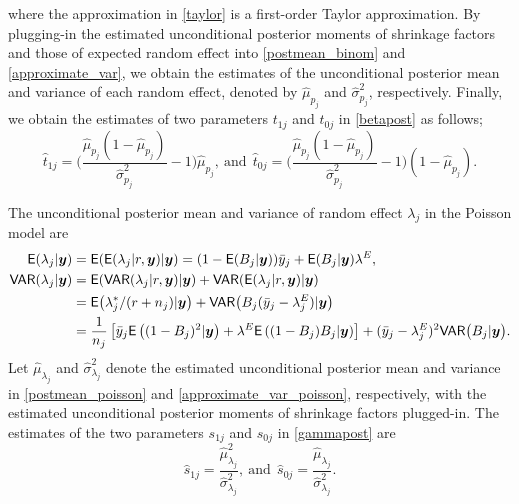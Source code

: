 \documentclass[article]{jss}
\begin{document}
where the approximation in \eqref{taylor} is a first-order Taylor approximation. By plugging-in the estimated unconditional posterior moments of shrinkage factors and those of expected random effect into   \eqref{postmean_binom} and \eqref{approximate_var}, we obtain the estimates of the unconditional posterior mean and variance of each random effect, denoted by $\hat{\mu}_{p_j}$ and $\hat{\sigma}^2_{p_j}$, respectively. Finally, we obtain the estimates of two parameters $t_{1j}$ and $t_{0j}$ in  \eqref{betapost} as follows;
\begin{equation}\label{posttrueprob}
\hat{t}_{1j}=\bigg(\frac{\hat{\mu}_{p_j}(1-\hat{\mu}_{p_j})}{\hat{\sigma}^2_{p_j}}-1\bigg)\hat{\mu}_{p_j},~\textrm{and}~~\hat{t}_{0j}=\bigg(\frac{\hat{\mu}_{p_j}(1-\hat{\mu}_{p_j})}{\hat{\sigma}^2_{p_j}}-1\bigg)(1-\hat{\mu}_{p_j}).
\end{equation}


The unconditional posterior mean and variance of random effect $\lambda_j$ in the Poisson model are
\begin{align}
\mathsf{E}(\lambda_j\vert \boldsymbol{y}) &=\mathsf{E}(\mathsf{E}(\lambda_{j}\vert r, \boldsymbol{y})\vert\boldsymbol{y})=(1-\mathsf{E}(B_j\vert\boldsymbol{y}))\bar{y}_j + \mathsf{E}(B_j\vert  \boldsymbol{y})\lambda^E,\label{postmean_poisson} \\
\mathsf{VAR}(\lambda_{j}\vert \boldsymbol{y}) &=  \mathsf{E}(\mathsf{VAR}(\lambda_{j}\vert r,  \boldsymbol{y})\vert \boldsymbol{y})+\mathsf{VAR}(\mathsf{E}(\lambda_{j}\vert r, \boldsymbol{y})\vert \boldsymbol{y})\label{postvar_poisson}\\
&= \mathsf{E}\big(\lambda^{\ast}_{j}/ (r+n_{j})\vert  \boldsymbol{y}\big)+\mathsf{VAR}\big(B_{j}(\bar{y}_{j}-\lambda^E_{j})\vert \boldsymbol{y}\big) \\
&=\frac{1}{n_j}\left[\bar{y}_j\mathsf{E}\left((1-B_j)^2\vert \boldsymbol{y}\right)+\lambda^E\mathsf{E}\left((1-B_j)B_j\vert \boldsymbol{y}\right)\right]+(\bar{y}_{j}-\lambda^E_{j})^2\mathsf{VAR}\big(B_{j}\vert \boldsymbol{y}\big).\label{approximate_var_poisson}
\end{align}
Let  $\hat{\mu}_{\lambda_j}$ and $\hat{\sigma}^2_{\lambda_j}$ denote the estimated unconditional posterior mean and variance in  \eqref{postmean_poisson} and \eqref{approximate_var_poisson}, respectively, with the estimated unconditional posterior moments of shrinkage factors plugged-in. The estimates of the two parameters $s_{1j}$ and $s_{0j}$ in  \eqref{gammapost} are
\begin{equation}\label{posttrueprob}
\hat{s}_{1j}=\frac{\hat{\mu}_{\lambda_j}^2}{\hat{\sigma}^2_{\lambda_j}},~\textrm{and}~~\hat{s}_{0j}=\frac{\hat{\mu}_{\lambda_j}}{\hat{\sigma}^2_{\lambda_j}}.
\end{equation}
\end{document}
